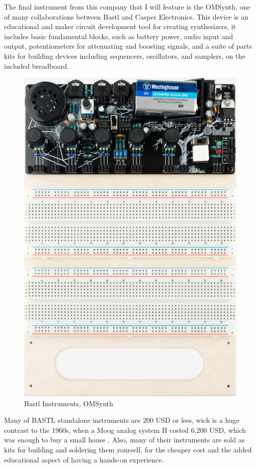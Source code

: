 The final instrument from this company that I will feature is the OMSynth, one of many collaborations between Bastl and Casper Electronics. This device is an educational and maker circuit development tool for creating synthesizers, it includes basic fundamental blocks, such as battery power, audio input and output, potentiometers for attenuating and boosting signals, and a suite of parts kits for building devices including sequencers, oscillators, and samplers, on the included breadboard.

\begin{figure}[h]
  \centering
  \includegraphics[width=0.75\linewidth,height=0.25\textheight,keepaspectratio]{images/bastl-omsynth.jpg}
  \caption{Bastl Instruments, OMSynth}
  \label{fig:bastl-omsynth}
\end{figure}

Many of BASTL standalone instruments are 200 USD or less, wich is a huge contrast to the 1960s, when a Moog analog system II costed 6,200 USD, which was enough to buy a small house \cite{analog-days}. Also, many of their instruments are sold as kits for building and soldering them yourself, for the cheaper cost and the added educational aspect of having a hands-on experience.

